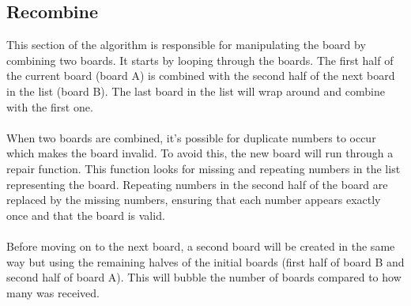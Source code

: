 \documentclass{scrartcl}
\begin{document}
\subsection*{Recombine} 
This section of the algorithm is responsible for manipulating the board by combining two boards. It starts by looping through the boards. The first half of the current board (board A) is combined with the second half of the next board in the list (board B). The last board in the list will wrap around and combine with the first one. \\ \\ When two boards are combined, it’s possible for duplicate numbers to occur which makes the board invalid. To avoid this, the new board will run through a repair function. This function looks for missing and repeating numbers in the list representing the board. Repeating numbers in the second half of the board are replaced by the missing numbers, ensuring that each number appears exactly once and that the board is valid. \\ \\ Before moving on to the next board, a second board will be created in the same way but using the remaining halves of the initial boards (first half of board B and second half of board A). This will bubble the number of boards compared to how many was received.
\end{document}
